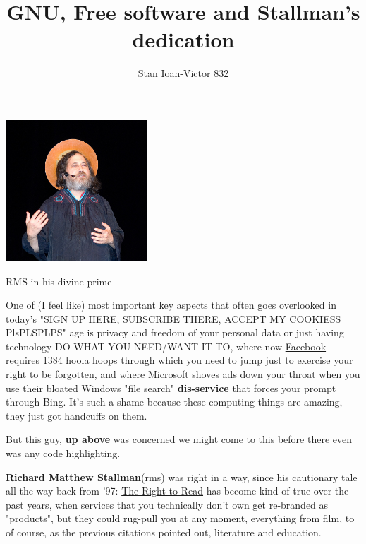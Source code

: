 \documentclass[sigplan,screen]{acmart}
\begin{document}
\title{GNU, Free software and Stallman's dedication}

\author{Stan Ioan-Victor 832}

\begin{teaserfigure}
	\includegraphics[width=200px]{pics/jesus-stallman.jpg}
	\centering
	\caption{RMS in his divine prime}
	\label{fig:teaser}
\end{teaserfigure}

\maketitle

One of (I feel like) most important key aspects that often goes overlooked in today's "SIGN UP HERE, SUBSCRIBE THERE, ACCEPT MY COOKIESS PlsPLSPLPS" age is privacy and freedom of your personal data or just having technology DO WHAT YOU NEED/WANT IT TO, where now \href{https://www.youtube.com/watch?v=MPyJBJTHyO0}{Facebook requires 1384 hoola hoops}\cite{tantacrul} through which you need to jump just to exercise your right to be forgotten, and where \href{https://www.youtube.com/watch?v=LZzubS1ILTs}{Microsoft shoves ads down your throat}\cite{jakey} when you use their bloated Windows "file search" \textbf{dis-service}\cite{BarraDRM} that forces your prompt through Bing. It's such a shame because these computing things are amazing, they just got handcuffs on them.

But this guy, \textbf{up above} was concerned we might come to this before there even was any code highlighting.

\textbf{Richard Matthew Stallman}(rms) was right in a way, since his cautionary tale all the way back from '97: \href{https://www.gnu.org/philosophy/right-to-read.html}{The Right to Read}\cite{Stallman1997TheRT} has become kind of true over the past years, when services that you technically don't own get re-branded as "products"\cite{product}, but they could rug-pull you at any moment, everything from film\cite{jellyfin}, to of course, as the previous citations pointed out, literature and education.
\end{document}
